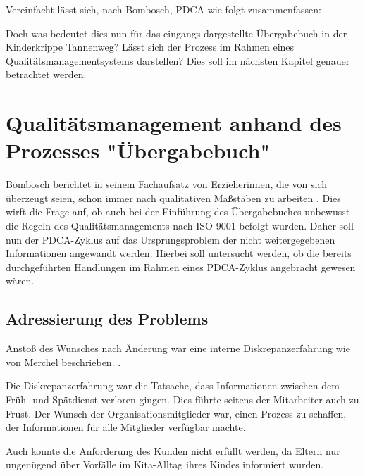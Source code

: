 Vereinfacht lässt sich, nach Bombosch, PDCA wie folgt zusammenfassen:  \citep[][199]{KitaMana}.


Doch was bedeutet dies nun für das eingangs dargestellte Übergabebuch in der Kinderkrippe Tannenweg? Lässt sich der Prozess im Rahmen eines Qualitätsmanagementsystems darstellen? Dies soll im nächsten Kapitel genauer betrachtet werden.

\newpage
\section{Qualitätsmanagement anhand des Prozesses "{}Übergabebuch"{}}

Bombosch berichtet in seinem Fachaufsatz von Erzieherinnen, die von sich überzeugt seien, schon immer nach qualitativen Maßstäben zu arbeiten \citep[vgl.][197]{KitaMana}. 
Dies wirft die Frage auf, ob auch bei der Einführung des Übergabebuches unbewusst die Regeln des Qualitätsmanagements nach ISO 9001 befolgt wurden. Daher soll nun der PDCA-Zyklus auf das Ursprungsproblem der nicht weitergegebenen Informationen angewandt werden. Hierbei soll untersucht werden, ob die bereits durchgeführten Handlungen im Rahmen eines PDCA-Zyklus angebracht gewesen wären.

\subsection{Adressierung des Problems}

Anstoß des Wunsches nach Änderung war eine interne Diskrepanzerfahrung wie von Merchel beschrieben.  \citep[][19]{Merchel2005}.

Die Diskrepanzerfahrung war die Tatsache, dass Informationen zwischen dem Früh- und Spätdienst verloren gingen. Dies führte seitens der Mitarbeiter auch zu Frust. Der Wunsch der Organisationsmitglieder war, einen Prozess zu schaffen, der Informationen für alle Mitglieder verfügbar machte. 

Auch konnte die Anforderung des Kunden \citep[vgl.][22]{ISO9001} nicht erfüllt werden, da Eltern nur ungenügend über Vorfälle im Kita-Alltag ihres Kindes informiert wurden.

